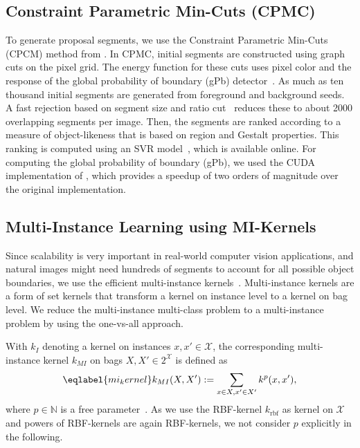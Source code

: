\subsection{Constraint Parametric Min-Cuts (CPMC)}
To generate proposal segments, we use the Constraint Parametric Min-Cuts (CPCM)
method from \citet{carreira2010constrained}. In CPMC, initial segments are
constructed using graph cuts on the pixel grid. The energy function for these cuts
uses pixel color and the response of the global probability of boundary (gPb)
detector~\citep{maire2008using}. As much as ten thousand initial segments are
generated from foreground and background seeds. A fast rejection based on
segment size and ratio cut~\citep{wang2003image} reduces these to about 2000
overlapping segments per image. Then, the segments are ranked according to a
measure of object-likeness that is based on region and Gestalt properties.
This ranking is computed using an SVR model~\citep{carreira2010constrained},
which is available online. 
\enlargethispage{10mm}
For computing the global probability of boundary
(gPb), we used the CUDA implementation of \citet{catanzaro2009efficient}, which
provides a speedup of two orders of magnitude over the original implementation.

\subsection{Multi-Instance Learning using MI-Kernels}
Since scalability is very important in real-world computer vision applications,
and natural images might need hundreds of segments to account for all possible
object boundaries, we use the efficient multi-instance
kernels~\citep{gaertner2002multi}.  Multi-instance kernels are a form of set
kernels %
 that transform a kernel on instance level to a kernel on bag level.  We
reduce the multi-instance multi-class problem to a multi-instance problem by
using the one-vs-all approach.

With $k_I$ denoting a kernel on instances $x,x' \in \mathcal{X}$, the
corresponding multi-instance kernel $k_{MI}$ on bags $X,X' \in 2^\mathcal{X}$
is defined as
\begin{equation}\eqlabel{mi_kernel}
k_{MI}(X,X') := \sum_{x \in X, x' \in X'} k^p(x,x'),
\end{equation}
where $p \in \mathbb{N}$ is a free parameter~\citep{gaertner2002multi}. As we use
the RBF-kernel $k_{\text{rbf}}$ as kernel on $\mathcal{X}$ and powers of RBF-kernels
are again RBF-kernels, we not consider $p$ explicitly in the following.

